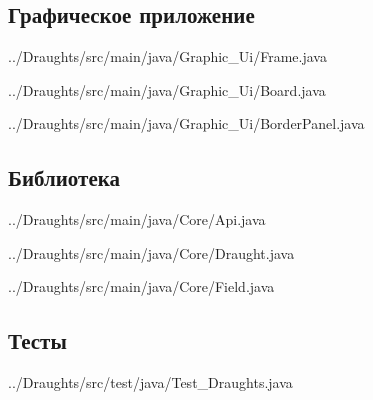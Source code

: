 \documentclass[a4paper]{article}
\begin{document}
\subsection{Графическое приложение}

{../Draughts/src/main/java/Graphic_Ui/Frame.java}
\newpage


{../Draughts/src/main/java/Graphic_Ui/Board.java}
\newpage


{../Draughts/src/main/java/Graphic_Ui/BorderPanel.java}
\newpage

\subsection{Библиотека}


{../Draughts/src/main/java/Core/Api.java}
\newpage


{../Draughts/src/main/java/Core/Draught.java}
\newpage


{../Draughts/src/main/java/Core/Field.java}
\newpage

\subsection{Тесты}


{../Draughts/src/test/java/Test_Draughts.java}
\newpage
\end{document}
